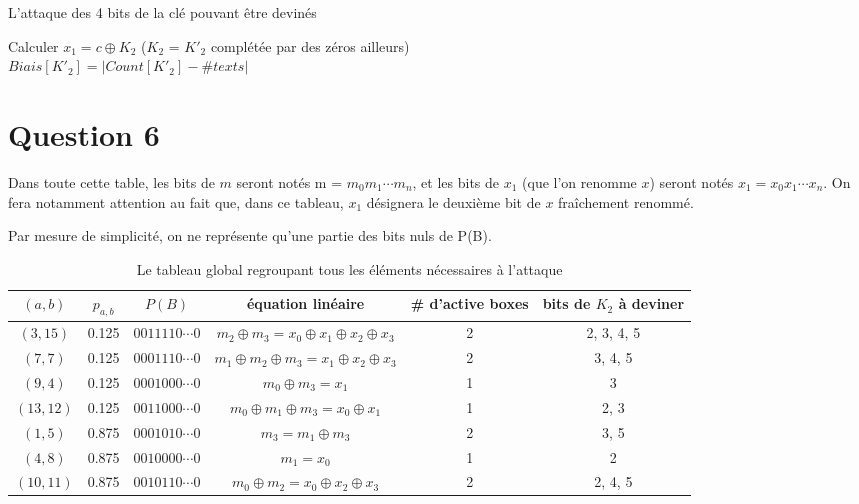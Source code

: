 \begin{algorithm}
\caption{L'attaque des 4 bits de la clé pouvant être devinés}
	{
		{
			{
				Calculer $x_1 = c \oplus K_2$ ($K_2$ = $K'_2$ complétée par des zéros ailleurs) \\
			}
		$Biais[K'_2] = | Count[K'_2] - \# texts |$
		}
		
	}
\end{algorithm}

\section*{Question 6}

Dans toute cette table, les bits de $m$ seront notés m = $m_0 m_1\cdots m_n$, et les bits de $x_1$ (que l'on renomme $x$) seront notés $x_1 = x_0 x_1 \cdots x_n$. On fera notamment attention au fait que, dans ce tableau, $x_1$ désignera le deuxième bit de $x$ fraîchement renommé.

Par mesure de simplicité, on ne représente qu'une partie des bits nuls de P(B).

\begin{table}[!ht]
\centering
\begin{small}
\begin{tabular}{|c|c|c|c|c|c|}
	\hline
	$(a,b)$   & $p_{a,b}$ & 		$P(B)$ 	   & équation linéaire	 & \# d'active boxes & bits de $K_2$ à deviner \\
	\hline
	$(3,15)$  &   0.125   & $0011110\cdots0$ & $m_2 \oplus m_3 = x_0 \oplus x_1 \oplus x_2 \oplus x_3$ & 2 & 2, 3, 4, 5 \\
	\hline
	$(7,7)$   &   0.125   & $0001110\cdots0$ & $m_1 \oplus m_2 \oplus m_3 = x_1 \oplus x_2 \oplus x_3$ & 2 & 3, 4, 5\\
	\hline
	$(9,4)$   &   0.125   & $0001000\cdots0$ & $m_0 \oplus m_3 = x_1$ 								   & 1 & 3 \\
	\hline
	$(13,12)$ &   0.125   & $0011000\cdots0$ & $m_0 \oplus m_1 \oplus m_3 = x_0 \oplus x_1$ 		   & 1 & 2, 3 \\
	\hline
	$(1,5)$   &   0.875   & $0001010\cdots0$ & $m_3 = m_1 \oplus m_3$								   & 2 & 3, 5 \\
	\hline
	$(4,8)$   &   0.875   & $0010000\cdots0$ & $m_1 = x_0$ 											   & 1 & 2 \\
	\hline
	$(10,11)$ &   0.875   & $0010110\cdots0$ & $m_0 \oplus m_2 = x_0 \oplus x_2 \oplus x_3$			   & 2 & 2, 4, 5 \\
	\hline
\end{tabular}
\end{small}
\caption{Le tableau global regroupant tous les éléments nécessaires à l'attaque}
\end{table}

